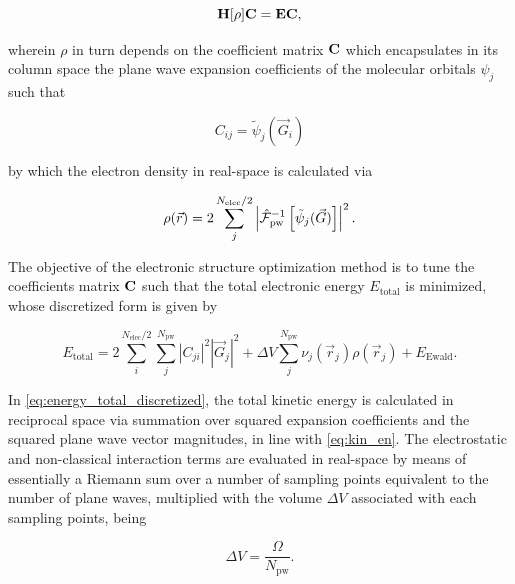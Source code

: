 \begin{equation}
    \mathbf{H}[\rho]\mathbf{C} = \mathbf{E}\mathbf{C},
    \label{eq:roothaan_explicit}
\end{equation}

wherein $\rho$ in turn depends on the coefficient matrix $\mathbf{C}$ which encapsulates in its column space the plane wave expansion coefficients of the molecular orbitals $\psi_{j}$ such that

\begin{equation}
    C_{ij} = \tilde{\psi}_{j}(\vec{G}_{i})
\end{equation}

by which the electron density in real-space is calculated via

\begin{equation}
    \rho(\vec{r}) = 2\sum_{j}^{N_{\text{elec}} / 2} \left|\hat{\mathcal{F}}_{\text{pw}}^{-1} \left[ \tilde{\psi}_{j}(\vec{G}) \right] \right|^{2}.
    \label{eq:edens}
\end{equation}

The objective of the electronic structure optimization method is to tune the coefficients matrix $\mathbf{C}$ such that the total electronic energy $E_{\text{total}}$ is minimized, whose discretized form is given by

\begin{equation}
    E_{\text{total}} = 2\sum_{i}^{N_{\text{elec}}/2} \sum_{j}^{N_{\text{pw}}} |C_{ji}|^{2} |\vec{G}_{j}|^{2} + \Delta V \sum_{j}^{N_{\text{pw}}} \nu_{j}(\vec{r}_{j}) \rho(\vec{r}_{j}) + E_{\text{Ewald}}.
    \label{eq:energy_total_discretized}
\end{equation}

In \cref{eq:energy_total_discretized}, the total kinetic energy is calculated in reciprocal space via summation over squared expansion coefficients and the squared plane wave vector magnitudes, in line with \cref{eq:kin_en}. The electrostatic and non-classical interaction terms are evaluated in real-space by means of essentially a Riemann sum over a number of sampling points equivalent to the number of plane waves, multiplied with the volume $\Delta V$ associated with each sampling points, being

\begin{equation}
    \Delta V = \frac{\Omega}{N_{\text{pw}}}.
\end{equation}

